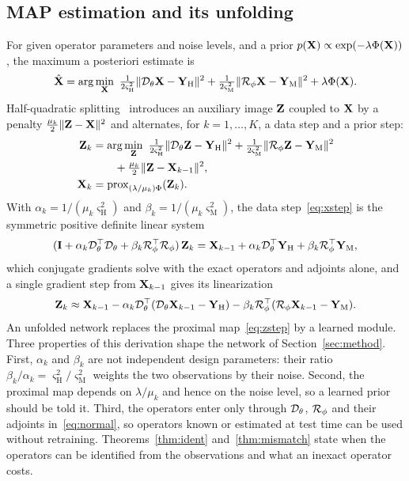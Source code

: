 \documentclass[journal]{IEEEtran}
\begin{document}
\subsection{MAP estimation and its unfolding}
\label{sec:hqs}
For given operator parameters and noise levels, and a prior $p(\mathbf{X})\propto\exp(-\lambda\Phi(\mathbf{X}))$, the maximum a posteriori estimate is
\begin{equation}
\hat{\X}=\arg\min_{\X}\ \tfrac{1}{2\varsigma_{\mathrm{H}}^2}\|\D_\theta\X-\YH\|^2+\tfrac{1}{2\varsigma_{\mathrm{M}}^2}\|\R_\phi\X-\YM\|^2+\lambda\Phi(\X).
\label{eq:map}
\end{equation}
Half-quadratic splitting~\cite{zhang2020usrnet} introduces an auxiliary image $\mathbf{Z}$ coupled to $\mathbf{X}$ by a penalty $\tfrac{\mu_k}{2}\|\mathbf{Z}-\mathbf{X}\|^2$ and alternates, for $k=1,\dots,K$, a data step and a prior step:
\begin{align}
\Z_k&=\arg\min_{\Z}\ \tfrac{1}{2\varsigma_{\mathrm{H}}^2}\|\D_\theta\Z-\YH\|^2+\tfrac{1}{2\varsigma_{\mathrm{M}}^2}\|\R_\phi\Z-\YM\|^2\nonumber\\
&\qquad+\tfrac{\mu_k}{2}\|\Z-\X_{k-1}\|^2,\label{eq:xstep}\\
\X_k&=\mathrm{prox}_{(\lambda/\mu_k)\Phi}(\Z_k).\label{eq:zstep}
\end{align}
With $\alpha_k=1/(\mu_k\varsigma_{\mathrm{H}}^2)$ and $\beta_k=1/(\mu_k\varsigma_{\mathrm{M}}^2)$, the data step~\eqref{eq:xstep} is the symmetric positive definite linear system
\begin{equation}
(\mathbf{I}+\alpha_k\mathcal{D}_\theta^{\top}\mathcal{D}_\theta+\beta_k\mathcal{R}_\phi^{\top}\mathcal{R}_\phi)\,\mathbf{Z}_k=\mathbf{X}_{k-1}+\alpha_k\mathcal{D}_\theta^{\top}\mathbf{Y}_{\mathrm{H}}+\beta_k\mathcal{R}_\phi^{\top}\mathbf{Y}_{\mathrm{M}},
\label{eq:normal}
\end{equation}
which conjugate gradients solve with the exact operators and adjoints alone, and a single gradient step from $\mathbf{X}_{k-1}$ gives its linearization
\begin{equation}
\mathbf{Z}_k\approx\mathbf{X}_{k-1}-\alpha_k\mathcal{D}_\theta^{\top}(\mathcal{D}_\theta\mathbf{X}_{k-1}-\mathbf{Y}_{\mathrm{H}})-\beta_k\mathcal{R}_\phi^{\top}(\mathcal{R}_\phi\mathbf{X}_{k-1}-\mathbf{Y}_{\mathrm{M}}).
\label{eq:linstep}
\end{equation}
An unfolded network replaces the proximal map~\eqref{eq:zstep} by a learned module. Three properties of this derivation shape the network of Section~\ref{sec:method}. First, $\alpha_k$ and $\beta_k$ are not independent design parameters: their ratio $\beta_k/\alpha_k=\varsigma_{\mathrm{H}}^2/\varsigma_{\mathrm{M}}^2$ weights the two observations by their noise. Second, the proximal map depends on $\lambda/\mu_k$ and hence on the noise level, so a learned prior should be told it. Third, the operators enter only through $\mathcal{D}_\theta$, $\mathcal{R}_\phi$ and their adjoints in~\eqref{eq:normal}, so operators known or estimated at test time can be used without retraining. Theorems~\ref{thm:ident} and~\ref{thm:mismatch} state when the operators can be identified from the observations and what an inexact operator costs.
\end{document}
